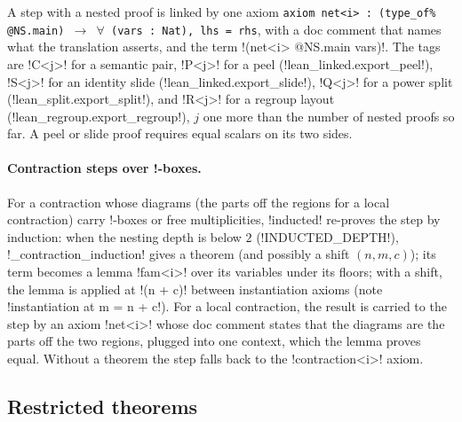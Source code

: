 A step with a nested proof is linked by one axiom \texttt{axiom net<i> : (\allowbreak{}type\_\allowbreak{}of\% @NS.\allowbreak{}main) $\to$ $\forall$ (\allowbreak{}vars : Nat),\allowbreak{} lhs = rhs}, with a doc comment that names what the translation asserts, and the term \code!(net<i> @NS.main vars)!. The tags are \code!C<j>! for a semantic pair, \code!P<j>! for a peel (\py!lean_linked.export_peel!), \code!S<j>! for an identity slide (\py!lean_linked.export_slide!), \code!Q<j>! for a power split (\py!lean_split.export_split!), and \code!R<j>! for a regroup layout (\py!lean_regroup.export_regroup!), $j$ one more than the number of nested proofs so far. A peel or slide proof requires equal scalars on its two sides.

\paragraph{Contraction steps over !-boxes.} For a contraction whose diagrams (the parts off the regions for a local contraction) carry !-boxes or free multiplicities, \py!inducted! re-proves the step by induction: when the nesting depth is below $2$ (\py!INDUCTED_DEPTH!), \py!_contraction_induction! gives a theorem (and possibly a shift $(n, m, c)$); its term becomes a lemma \code!fam<i>! over its variables under its floors; with a shift, the lemma is applied at \code!(n + c)! between instantiation axioms (note \code!instantiation at m = n + c!). For a local contraction, the result is carried to the step by an axiom \code!net<i>! whose doc comment states that the diagrams are the parts off the two regions, plugged into one context, which the lemma proves equal. Without a theorem the step falls back to the \code!contraction<i>! axiom.

\subsection{Restricted theorems}\label{sec:kernel-lean-restricted}

